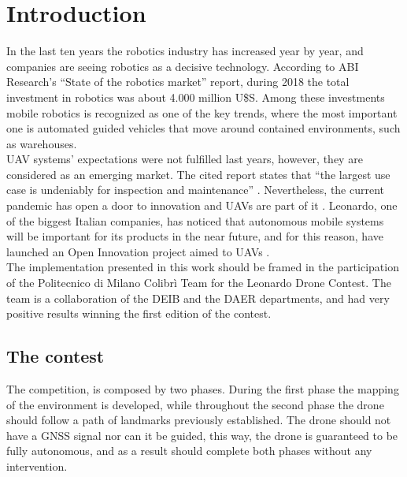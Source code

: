 \cleardoublepage
\chapter{Introduction}
\label{ch:chapter0:intro}
In the last ten years the robotics industry has increased year by year, and companies are seeing robotics as a decisive technology. According to ABI Research's \cite{abi-report} \enquote{State of the robotics market} report, during 2018 the total investment in robotics was about 4.000 million U\$S. Among these investments mobile robotics is recognized as one of the key trends, where the most important one is automated guided vehicles that move around contained environments, such as warehouses. \\

\ac{UAV} systems' expectations were not fulfilled last years, however, they are considered as an emerging market. The cited report states that \enquote{the largest use case is undeniably for inspection and maintenance} \cite{abi-report}. Nevertheless, the current pandemic has open a door to innovation and \ac{UAV}s are part of it \cite{eu-robotics-covid}. Leonardo, one of the biggest Italian companies, has noticed that autonomous mobile systems will be important for its products in the near future, and for this reason, have launched an Open Innovation project aimed to \ac{UAV}s \cite{leonardo-drone-contest}.\\

The implementation presented in this work should be framed in the participation of the Politecnico di Milano Colibrì Team for the Leonardo Drone Contest. The team is a collaboration of the DEIB and the DAER departments, and had very positive results winning the first edition of the contest. %
\section*{The contest}
The competition, is composed by two phases. During the first phase the mapping of the environment is developed, while throughout the second phase the drone should follow a path of landmarks previously established. The drone should not have a GNSS signal nor can it be guided, this way, the drone is guaranteed to be fully autonomous, and as a result should complete both phases without any intervention.\\

